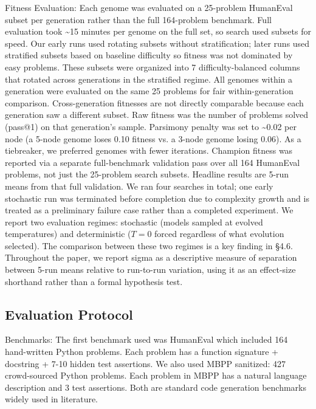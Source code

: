 \documentclass{article}
\begin{document}
Fitness Evaluation:
Each genome was evaluated on a 25-problem HumanEval subset per generation rather than the full 164-problem benchmark. Full evaluation took \textasciitilde15 minutes per genome on the full set, so search used subsets for speed. Our early runs used rotating subsets without stratification; later runs used stratified subsets based on baseline difficulty so fitness was not dominated by easy problems. These subsets were organized into 7 difficulty-balanced columns that rotated across generations in the stratified regime. All genomes within a generation were evaluated on the same 25 problems for fair within-generation comparison. Cross-generation fitnesses are not directly comparable because each generation saw a different subset. Raw fitness was the number of problems solved (pass@1) on that generation's sample. Parsimony penalty was set to \textasciitilde0.02 per node (a 5-node genome loses 0.10 fitness vs. a 3-node genome losing 0.06). As a tiebreaker, we preferred genomes with fewer iterations. Champion fitness was reported via a separate full-benchmark validation pass over all 164 HumanEval problems, not just the 25-problem search subsets. Headline results are 5-run means from that full validation. We ran four searches in total; one early stochastic run was terminated before completion due to complexity growth and is treated as a preliminary failure case rather than a completed experiment. We report two evaluation regimes: stochastic (models sampled at evolved temperatures) and deterministic ($T{=}0$ forced regardless of what evolution selected). The comparison between these two regimes is a key finding in \S4.6. Throughout the paper, we report sigma as a descriptive measure of separation between 5-run means relative to run-to-run variation, using it as an effect-size shorthand rather than a formal hypothesis test.

\subsection{Evaluation Protocol}
Benchmarks:
The first benchmark used was HumanEval \cite{humaneval2021} which included 164 hand-written Python problems. Each problem has a function signature + docstring + 7-10 hidden test assertions. We also used MBPP \cite{mbpp2021} sanitized: 427 crowd-sourced Python problems. Each problem in MBPP has a natural language description and 3 test assertions. Both are standard code generation benchmarks widely used in literature.
\end{document}
